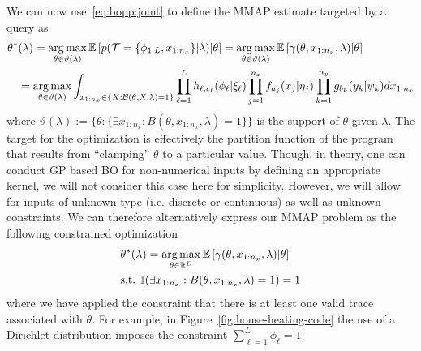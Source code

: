 We can now use~\eqref{eq:bopp:joint} to define the MMAP estimate targeted by a  query as
\begin{align}
\label{eq:bopp:mmap}
\begin{split}
\theta^*& (\lambda) = \operatorname*{arg\,max}_{\theta \in \vartheta (\lambda)} 
\mathbb{E} \left[p(\mathcal{T} = \{\phi_{1:L},x_{1:n_x}\} | \lambda) \middle| \theta \right]
= \operatorname*{arg\,max}_{\theta \in \vartheta (\lambda)} 
\mathbb{E} \left[\gamma(\theta,x_{1:n_x}, \lambda) \middle| \theta \right] \\
& = \operatorname*{arg\,max}_{\theta \in \vartheta (\lambda)} 
\int_{x_{1:n_x} \in \{X : \mathcal{B}(\theta,X,\lambda)=1\}} 
\prod_{\ell=1}^{L} h_{\ell,c_{\ell}} (\phi_{\ell} | \xi_{\ell})
\prod_{j=1}^{n_x} f_{a_j}(x_j | \eta_j) \prod_{k=1}^{n_y} g_{b_k}(y_k | \psi_k) dx_{1:n_x}
\end{split}
\end{align}
where $\vartheta (\lambda) := \{\theta : \{\exists x_{1:n_x} : B(\theta,x_{1:n_x},\lambda)=1\}\}$
is the support of $\theta$ given $\lambda$.  The target for the optimization is
effectively the partition function of the program that results from ``clamping'' $\theta$ to a particular
value.  Though, in theory, one can conduct GP based BO for non-numerical inputs by defining
an appropriate kernel, we will not consider this case here for simplicity.  However, we will allow for
inputs of unknown type (i.e. discrete or continuous) as well as unknown constraints.  We can
therefore alternatively express our MMAP problem as the following constrained optimization
\begin{align}
\label{eq:bopp:mmapconstr}
\begin{split}
&\theta^* (\lambda) 
= \operatorname*{arg\,max}_{\theta \in \mathbb{R}^D} 
\mathbb{E} \left[\gamma(\theta,x_{1:n_x}, \lambda) \middle| \theta \right] \\
	&\text{s.t.} \: \: \mathbb{I}(\exists x_{1:n_x} : B(\theta,x_{1:n_x},\lambda)=1) = 1
\end{split}
\end{align}
where we have applied the constraint that there is at least one valid trace associated with $\theta$.
For example, in Figure~\ref{fig:house-heating-code} the use of a Dirichlet distribution imposes
the constraint $\sum_{\ell=1}^{L} \phi_{\ell} = 1$.

